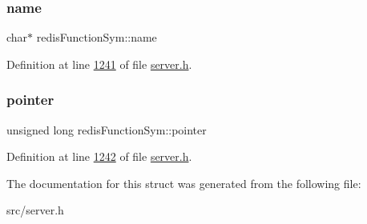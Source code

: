 \subsubsection{\texorpdfstring{name}{name}}
{\footnotesize\ttfamily char$\ast$ redis\+Function\+Sym\+::name}



Definition at line \hyperlink{server_8h_source_l01241}{1241} of file \hyperlink{server_8h_source}{server.\+h}.

\mbox{\label{structredisFunctionSym_a7f337baf5919325bf21f254459117758}} 
\subsubsection{\texorpdfstring{pointer}{pointer}}
{\footnotesize\ttfamily unsigned long redis\+Function\+Sym\+::pointer}



Definition at line \hyperlink{server_8h_source_l01242}{1242} of file \hyperlink{server_8h_source}{server.\+h}.



The documentation for this struct was generated from the following file\+:\begin{DoxyCompactItemize}
\item 
src/server.\+h\end{DoxyCompactItemize}
